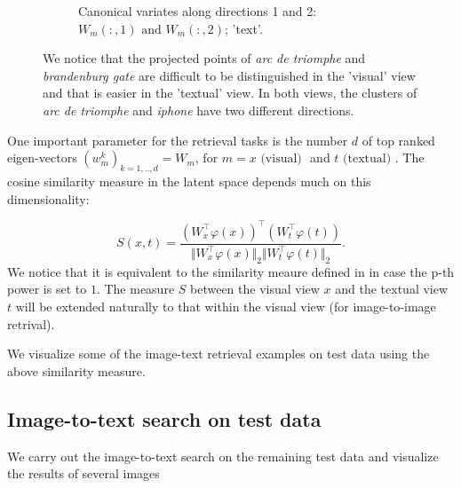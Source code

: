 \documentclass[12pt]{report}	%
\def\ts{\top}
\begin{document}
\begin{figure}[H]
{\begin{subfigure}[b]{0.62\textwidth}
                \caption{Canonical variates along directions 1 and 2:\\ $W_m(:,1)\text{ and } W_m(:,2)$; 'text'. }
                \label{fig:1-real23}
        \end{subfigure}}
       \caption{We notice that the projected points of \textit{arc de triomphe} and \textit{brandenburg gate} are difficult to be distinguished in the 'visual' view and that is easier in the 'textual' view. In both views, the clusters of \textit{arc de triomphe} and \textit{iphone} have two different directions.}
\label{fig:1-reall23}
\end{figure} 


One important parameter for the retrieval tasks is the number $d$ of top ranked eigen-vectors $(w_m^k)_{k=1,..,d} = W_m$, for $m = x \text{ (visual) }$ and $t\text{ (textual) }$. The cosine similarity measure in the latent space depends much on this dimensionality:

$$ S(x,t) = \frac{ ( W_x^{\ts}\varphi(x))^{\ts}(W_t^{\ts}\varphi(t))} {\Vert W_x^{\ts}\varphi(x) \Vert_2 \Vert W_t^{\ts}\varphi(t) \Vert_2}.
$$
We notice that it is equivalent to the similarity meaure defined in \citep{cca0} in case the p-th power is set to $1$. The measure $S$ between the visual view $x$ and the textual view $t$ will be extended naturally to that within the visual view (for image-to-image retrival). 

We visualize some of the image-text retrieval examples on test data using the above similarity measure.

\subsection{Image-to-text search on test data}

We carry out the image-to-text search on the remaining test data and visualize the results of several images

\begin{figure}[H]
\centering
{}
\label{fig:inria-dataset}
\end{figure} 

\begin{figure}[H]
\centering
{}
\label{fig:inria-dataset}
\end{figure} 
\end{document}
